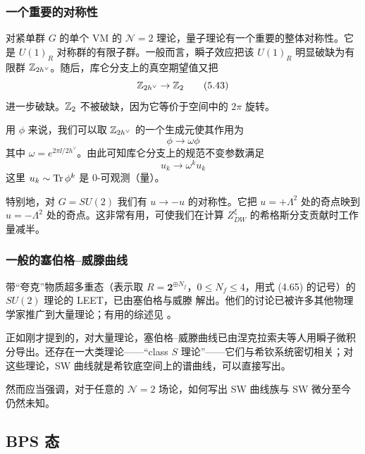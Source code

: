 \subsubsection{一个重要的对称性}

对紧单群 $G$ 的单个 VM 的 $\mathcal{N}=2$ 理论，量子理论有一个重要的整体对称性。它是 $U(1)_{R}$ 对称群的有限子群。一般而言，瞬子效应把该 $U(1)_{R}$ 明显破缺为有限群 $\mathbb{Z}_{2h^{\vee}}$。随后，库仑分支上的真空期望值又把
\begin{equation}
\mathbb{Z}_{2h^{\vee}}\to\mathbb{Z}_{2}
\tag{5.43}
\end{equation}
进一步破缺。$\mathbb{Z}_{2}$ 不被破缺，因为它等价于空间中的 $2\pi$ 旋转。

用 $\phi$ 来说，我们可以取 $\mathbb{Z}_{2h^{\vee}}$ 的一个生成元使其作用为
\begin{equation}
\phi\to\omega\phi
\tag{5.44}
\end{equation}
其中 $\omega=e^{2\pi\ii/2h^{\vee}}$。由此可知库仑分支上的规范不变参数满足
\begin{equation}
u_{k}\to\omega^{k}u_{k}
\tag{5.45}
\end{equation}
这里 $u_{k}\sim\operatorname{Tr}\phi^{k}$ 是 0-可观测（量）。

特别地，对 $G=SU(2)$ 我们有 $u\to-u$ 的对称性。它把 $u=+\Lambda^{2}$ 处的奇点映到 $u=-\Lambda^{2}$ 处的奇点。这非常有用，可使我们在计算 $Z^{\xi}_{DW}$ 的希格斯分支贡献时工作量减半。

\subsubsection{一般的塞伯格--威滕曲线}

带“夸克”物质超多重态（表示取 $R=\mathbf{2}^{\oplus N_{f}}$，$0\le N_{f}\le4$，用式 (4.65) 的记号）的 $SU(2)$ 理论的 LEET，已由塞伯格与威滕 \cite{ref47,ref46} 解出。他们的讨论已被许多其他物理学家推广到大量理论；有用的综述见 \cite{ref51}。

正如刚才提到的，对大量理论，塞伯格--威滕曲线已由涅克拉索夫等人用瞬子微积分导出。还存在一大类理论——“class $S$ 理论”——它们与希钦系统密切相关；对这些理论，SW 曲线就是希钦底空间上的谱曲线，可以直接写出。

然而应当强调，对于任意的 $\mathcal{N}=2$ 场论，如何写出 SW 曲线族与 SW 微分至今仍然未知。

\subsection{BPS 态}

